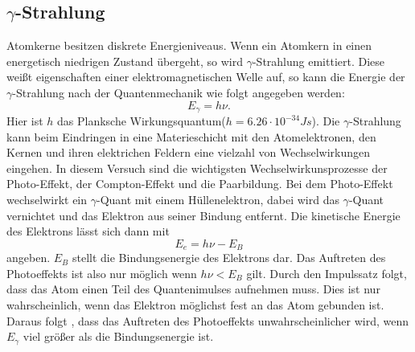 \subsection{\texorpdfstring{$\gamma$}{Gamma}-Strahlung}
Atomkerne besitzen diskrete Energieniveaus.
Wenn ein Atomkern in einen energetisch niedrigen Zustand übergeht, so wird $\gamma$-Strahlung emittiert.
Diese weißt eigenschaften einer elektromagnetischen Welle auf, so kann die Energie der $\gamma$-Strahlung
nach der Quantenmechanik wie folgt angegeben werden:
\begin{equation}
  E_\gamma = h\nu  .
\end{equation}
Hier ist $h$ das Planksche Wirkungsquantum($h=6.26\cdot 10^{-34} J s$\cite{planck}).
Die $\gamma$-Strahlung kann beim Eindringen in eine Materieschicht mit den Atomelektronen, den Kernen und ihren elektrichen Feldern eine vielzahl von Wechselwirkungen eingehen.
In diesem Versuch sind die wichtigsten Wechselwirkunsprozesse der Photo-Effekt, der Compton-Effekt und die Paarbildung.
Bei dem Photo-Effekt wechselwirkt ein $\gamma$-Quant mit einem Hüllenelektron, dabei wird das $\gamma$-Quant vernichtet und das Elektron aus seiner Bindung entfernt.
Die kinetische Energie des Elektrons lässt sich dann mit
\begin{equation}
  E_e = h\nu - E_B
\end{equation}
angeben.
$E_B$ stellt die Bindungsenergie des Elektrons dar.
Das Auftreten des Photoeffekts ist also nur möglich wenn $h\nu < E_B$ gilt.
Durch den Impulssatz folgt, dass das Atom einen Teil des Quantenimulses aufnehmen muss.
Dies ist nur wahrscheinlich, wenn das Elektron möglichst fest an das Atom gebunden ist.
Daraus folgt , dass das Auftreten des Photoeffekts unwahrscheinlicher wird, wenn $E_\gamma$  viel größer als die Bindungsenergie ist.

